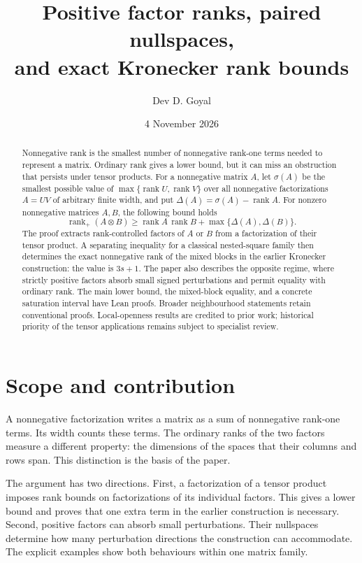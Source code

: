 \documentclass[11pt]{article}
\title{\textbf{Positive factor ranks, paired nullspaces,\\and exact Kronecker rank bounds}}
\author{Dev D. Goyal}
\date{4 November 2026}
\theoremstyle{definition}\newtheorem{definition}[theorem]{Definition}
\theoremstyle{remark}\newtheorem{remark}[theorem]{Remark}
\newcommand{\rk}{\operatorname{rank}}
\newcommand{\rp}{\operatorname{rank}_{+}}
\begin{document}
\maketitle

\begin{abstract}
Nonnegative rank is the smallest number of nonnegative rank-one terms needed to represent a matrix. Ordinary rank gives a lower bound, but it can miss an obstruction that persists under tensor products. For a nonnegative matrix $A$, let $\sigma(A)$ be the smallest possible value of $\max\{\rk U,\rk V\}$ over all nonnegative factorizations $A=UV$ of arbitrary finite width, and put $\Delta(A)=\sigma(A)-\rk A$. For nonzero nonnegative matrices $A,B$, the following bound holds
\[
\rp(A\otimes B)\ge\rk A\,\rk B+\max\{\Delta(A),\Delta(B)\}.
\]
The proof extracts rank-controlled factors of $A$ or $B$ from a factorization of their tensor product. A separating inequality for a classical nested-square family then determines the exact nonnegative rank of the mixed blocks in the earlier Kronecker construction: the value is $3s+1$. The paper also describes the opposite regime, where strictly positive factors absorb small signed perturbations and permit equality with ordinary rank. The main lower bound, the mixed-block equality, and a concrete saturation interval have Lean proofs. Broader neighbourhood statements retain conventional proofs. Local-openness results are credited to prior work; historical priority of the tensor applications remains subject to specialist review.
\end{abstract}

\section{Scope and contribution}

A nonnegative factorization writes a matrix as a sum of nonnegative rank-one terms. Its width counts these terms. The ordinary ranks of the two factors measure a different property: the dimensions of the spaces that their columns and rows span. This distinction is the basis of the paper.

The argument has two directions. First, a factorization of a tensor product imposes rank bounds on factorizations of its individual factors. This gives a lower bound and proves that one extra term in the earlier construction is necessary. Second, positive factors can absorb small perturbations. Their nullspaces determine how many perturbation directions the construction can accommodate. The explicit examples show both behaviours within one matrix family.
\end{document}
